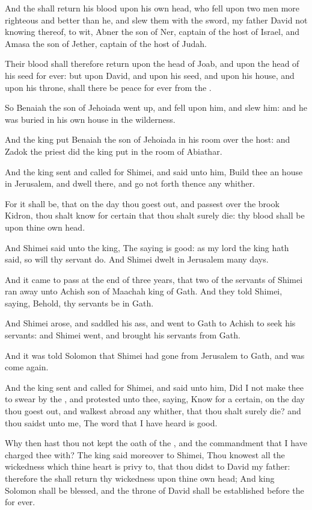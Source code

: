 \verse And the \LORD shall return his blood upon his own head, who fell upon two men more righteous and better than he, and slew them with the sword, my father David not knowing thereof, to wit, Abner the son of Ner, captain of the host of Israel, and Amasa the son of Jether, captain of the host of Judah.

\verse Their blood shall therefore return upon the head of Joab, and upon the head of his seed for ever: but upon David, and upon his seed, and upon his house, and upon his throne, shall there be peace for ever from the \LORD.

\verse So Benaiah the son of Jehoiada went up, and fell upon him, and slew him: and he was buried in his own house in the wilderness.

\verse And the king put Benaiah the son of Jehoiada in his room over the host: and Zadok the priest did the king put in the room of Abiathar.

\verse And the king sent and called for Shimei, and said unto him, Build thee an house in Jerusalem, and dwell there, and go not forth thence any whither.

\verse For it shall be, that on the day thou goest out, and passest over the brook Kidron, thou shalt know for certain that thou shalt surely die: thy blood shall be upon thine own head.

\verse And Shimei said unto the king, The saying is good: as my lord the king hath said, so will thy servant do. And Shimei dwelt in Jerusalem many days.

\verse And it came to pass at the end of three years, that two of the servants of Shimei ran away unto Achish son of Maachah king of Gath.  And they told Shimei, saying, Behold, thy servants be in Gath.

\verse And Shimei arose, and saddled his ass, and went to Gath to Achish to seek his servants: and Shimei went, and brought his servants from Gath.

\verse And it was told Solomon that Shimei had gone from Jerusalem to Gath, and was come again.

\verse And the king sent and called for Shimei, and said unto him, Did I not make thee to swear by the \LORD, and protested unto thee, saying, Know for a certain, on the day thou goest out, and walkest abroad any whither, that thou shalt surely die? and thou saidst unto me, The word that I have heard is good.

\verse Why then hast thou not kept the oath of the \LORD, and the commandment that I have charged thee with?  \verse The king said moreover to Shimei, Thou knowest all the wickedness which thine heart is privy to, that thou didst to David my father: therefore the \LORD shall return thy wickedness upon thine own head; \verse And king Solomon shall be blessed, and the throne of David shall be established before the \LORD for ever.

